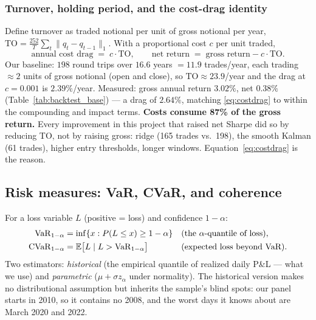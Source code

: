 \subsubsection{Turnover, holding period, and the cost-drag identity}

Define turnover as traded notional per unit of gross notional per year,
$\mathrm{TO} = \frac{252}{T}\sum_t\lVert q_t-q_{t-1}\rVert_1$. With a proportional cost
$c$ per unit traded,
\begin{equation}
  \text{annual cost drag} \;=\; c\cdot\mathrm{TO},
  \qquad
  \text{net return} \;=\; \text{gross return} - c\cdot\mathrm{TO}.
  \label{eq:costdrag}
\end{equation}
Our baseline: $198$ round trips over $16.6$ years $=11.9$ trades/year, each trading
$\approx2$ units of gross notional (open and close), so $\mathrm{TO}\approx23.9$/year and
the drag at $c=0.001$ is $2.39\%$/year. Measured: gross annual return $3.02\%$, net
$0.38\%$ (Table~\ref{tab:backtest_base}) --- a drag of $2.64\%$, matching
\eqref{eq:costdrag} to within the compounding and impact terms. \textbf{Costs consume
87\% of the gross return.} Every improvement in this project that raised net Sharpe did so
by reducing TO, not by raising gross: ridge (165 trades vs.\ 198), the smooth Kalman
(61 trades), higher entry thresholds, longer windows. Equation~\eqref{eq:costdrag} is the
reason.

\subsection{Risk measures: VaR, CVaR, and coherence}
\label{sec:bt:risk}

For a loss variable $L$ (positive = loss) and confidence $1-\alpha$:
\begin{align}
  \mathrm{VaR}_{1-\alpha} &= \inf\{x: P(L\le x)\ge 1-\alpha\} &&\text{(the } \alpha\text{-quantile of loss)}, \label{eq:var}\\
  \mathrm{CVaR}_{1-\alpha} &= \mathbb{E}\bigl[L \mid L>\mathrm{VaR}_{1-\alpha}\bigr] &&\text{(expected loss beyond VaR)}. \label{eq:cvar}
\end{align}
Two estimators: \emph{historical} (the empirical quantile of realized daily P\&L --- what
we use) and \emph{parametric} ($\mu+\sigma z_\alpha$ under normality). The historical
version makes no distributional assumption but inherits the sample's blind spots: our
panel starts in 2010, so it contains no 2008, and the worst days it knows about are
March 2020 and 2022.

